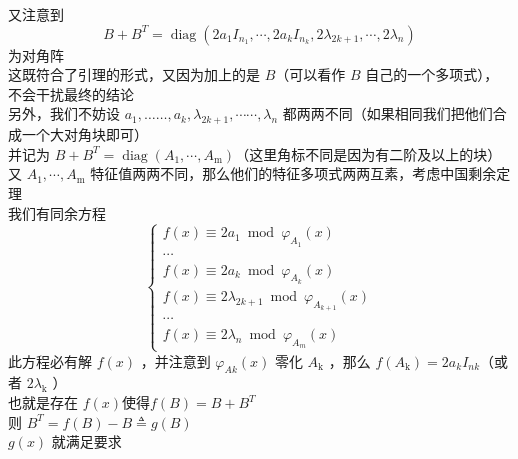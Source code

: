 \documentclass[UTF8]{ctexart}
\begin{document}
\noindent 又注意到\\
$$B+B^{T}=\operatorname{diag}\left(2 a_{1} I_{n_1}, \cdots, 2 a_{k} I_{n_k}, 2 \lambda_{2 k+1}, \cdots, 2 \lambda_{n}\right)$$
为对角阵\\
这既符合了引理的形式，又因为加上的是 $B$（可以看作 $B$ 自己的一个多项式），不会干扰最终的结论\\
另外，我们不妨设 $a_{1}, \ldots \ldots, a_{k}, \lambda_{2 k+1}, \cdots \cdots, \lambda_{n}$ 都两两不同（如果相同我们把他们合成一个大对角块即可）\\
并记为 $B+B^{T}=\operatorname{diag}\left(A_{1}, \cdots, A_{\mathrm{m}}\right)$（这里角标不同是因为有二阶及以上的块）\\
又 $A_{1}, \cdots, A_{\mathrm{m}}$ 特征值两两不同，那么他们的特征多项式两两互素，考虑中国剩余定理\\
我们有同余方程\\
$$
\left\{
\begin{array}{l}
	f(x) \equiv 2 a_{1} \bmod \varphi_{A_{1}}(x) \\
		\cdots  \\
	f(x) \equiv 2 a_{k} \bmod \varphi_{A_{k}}(x) \\
	f(x) \equiv 2 \lambda_{2k+1} \bmod \varphi_{A_{k+1}}(x) \\
	\cdots  \\
	f(x) \equiv 2 \lambda_{n} \bmod \varphi_{A_{m}}(x)
\end{array}
\right.
$$
此方程必有解 $f(x)$ ，并注意到 $\varphi_{A k}(x)$ 零化 $A_{\mathrm{k}}$ ，那么 $f\left(A_{\mathrm{k}}\right)=2 a_{k} I_{n k}$（或者 $2 \lambda_{\mathrm{k}}$ ）\\
也就是存在 $f(x) $使得$f(B)=B+B^{T}$\\
则 $B^{T}=f(B)-B \triangleq g(B)$\\
$g(x)$ 就满足要求\\
\end{document}

